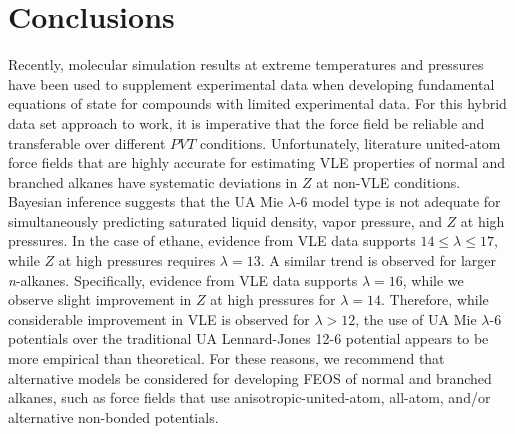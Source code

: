 \documentclass[journal=jctc,manuscript=article]{achemso}
\begin{document}
 
\section{Conclusions} \label{Conclusions}

Recently, molecular simulation results at extreme temperatures and pressures have been used to supplement experimental data when developing fundamental equations of state for compounds with limited experimental data. For this hybrid data set approach to work, it is imperative that the force field be reliable and transferable over different $PVT$ conditions. Unfortunately, literature united-atom force fields that are highly accurate for estimating VLE properties of normal and branched alkanes have systematic deviations in $Z$ at non-VLE conditions. Bayesian inference suggests that the UA Mie $\lambda$-6 model type is not adequate for simultaneously predicting saturated liquid density, vapor pressure, and $Z$ at high pressures. In the case of ethane, evidence from VLE data supports $14 \le \lambda \le 17$, while $Z$ at high pressures requires $\lambda = 13$. A similar trend is observed for larger \textit{n}-alkanes. Specifically, evidence from VLE data supports $\lambda = 16$, while we observe slight improvement in $Z$ at high pressures for $\lambda = 14$. Therefore, while considerable improvement in VLE is observed for $\lambda > 12$, the use of UA Mie $\lambda$-6 potentials over the traditional UA Lennard-Jones 12-6 potential appears to be more empirical than theoretical. For these reasons, we recommend that alternative models be considered for developing FEOS of normal and branched alkanes, such as force fields that use anisotropic-united-atom, all-atom, and/or alternative non-bonded potentials.
\end{document}
